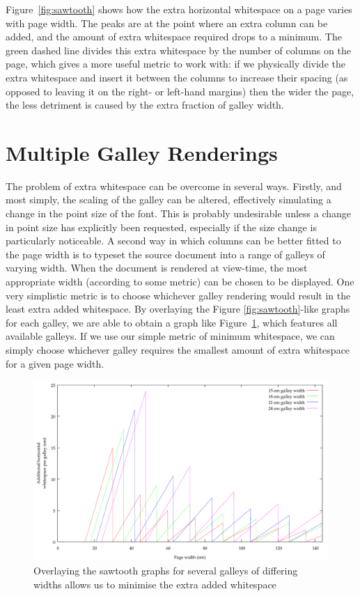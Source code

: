 Figure~\ref{fig:sawtooth} shows how the extra horizontal whitespace on a page varies with page width. The peaks are at the point where an extra column can be added, and the amount of extra whitespace required drops to a minimum. The green dashed line divides this extra whitespace by the number of columns on the page, which gives a more useful metric to work with: if we physically divide the extra whitespace and insert it between the columns to increase their spacing (as opposed to leaving it on the right- or left-hand margins) then the wider the page, the less detriment is caused by the extra fraction of galley width.

\section{Multiple Galley Renderings}
The problem of extra whitespace can be overcome in several ways. Firstly, and most simply, the scaling of the galley can be altered, effectively simulating a change in the point size of the font. This is probably undesirable unless a change in point size has explicitly been requested, especially if the size change is particularly noticeable.
A second way in which columns can be better fitted to the page width is to typeset the source document into a range of galleys of varying width. When the document is rendered at view-time, the most appropriate width (according to some metric) can be chosen to be displayed. One very simplistic metric is to choose whichever galley rendering would result in the least extra added whitespace. By overlaying the Figure \mbox{\ref{fig:sawtooth}-like} graphs for each galley, we are able to obtain a graph like Figure~\ref{fig:overlay}, which features all available galleys. If we use our simple metric of minimum whitespace, we can simply choose whichever galley requires the smallest amount of extra whitespace for a given page width.

\begin{figure}
 \includegraphics[width=\textwidth]{gnuplot/overlay}
 \caption[Extra whitespace in a multi-galley document]{Overlaying the sawtooth graphs for several galleys of differing widths allows us to minimise the extra added whitespace}
 \label{fig:overlay}
\end{figure}

